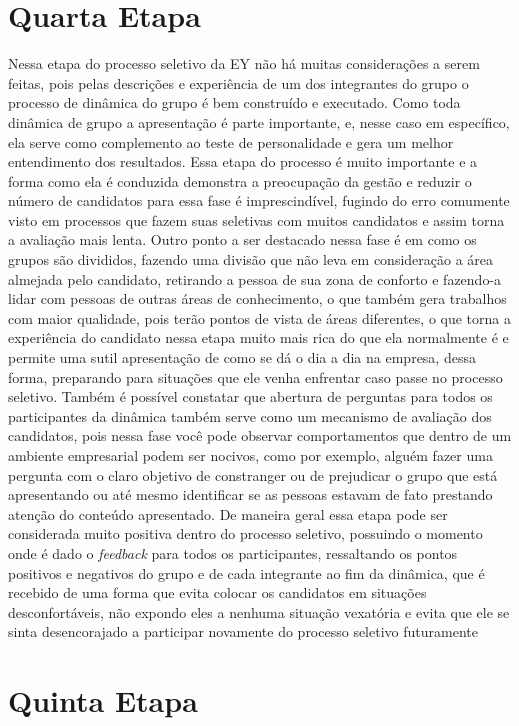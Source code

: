 \section{Quarta Etapa}
Nessa etapa do processo seletivo da EY não há muitas considerações a serem feitas, pois pelas descrições e experiência de um dos integrantes do grupo o processo de dinâmica do grupo é bem construído e executado.  Como toda dinâmica de grupo a apresentação é parte importante, e, nesse caso em específico, ela serve como complemento ao teste de personalidade e gera um melhor entendimento dos resultados. Essa etapa do processo é muito importante e a forma como ela é conduzida demonstra a preocupação da gestão e reduzir o número de candidatos para essa fase é imprescindível, fugindo do erro comumente visto em processos que fazem suas seletivas com muitos candidatos e assim torna a avaliação mais lenta. Outro ponto a ser destacado nessa fase é em como os grupos são divididos, fazendo uma divisão que não leva em consideração a área almejada pelo candidato, retirando a pessoa de sua zona de conforto e fazendo-a lidar com pessoas de outras áreas de conhecimento, o que também gera trabalhos com maior qualidade, pois terão pontos de vista de áreas diferentes, o que torna a experiência do candidato nessa etapa muito mais rica do que ela normalmente é e permite uma sutil apresentação de como se dá o dia a dia na empresa, dessa forma, preparando para situações que ele venha enfrentar caso passe no processo seletivo. Também é possível constatar que abertura de perguntas para todos os participantes da dinâmica também serve como um mecanismo de avaliação dos candidatos, pois nessa fase você pode observar comportamentos que dentro de um ambiente empresarial podem ser nocivos, como por exemplo, alguém fazer uma pergunta com o claro objetivo de constranger ou de prejudicar o grupo que está apresentando ou até mesmo identificar se as pessoas estavam de fato prestando atenção do conteúdo apresentado. De maneira geral essa etapa pode ser considerada muito positiva dentro do processo seletivo, possuindo o momento onde é dado o \textit{feedback} para todos os participantes, ressaltando os pontos positivos e negativos do grupo e de cada integrante ao fim da dinâmica, que é recebido de uma forma que evita colocar os candidatos em situações desconfortáveis, não expondo eles a nenhuma situação vexatória e evita que ele se sinta desencorajado a participar novamente do processo seletivo futuramente


\section{Quinta Etapa}

